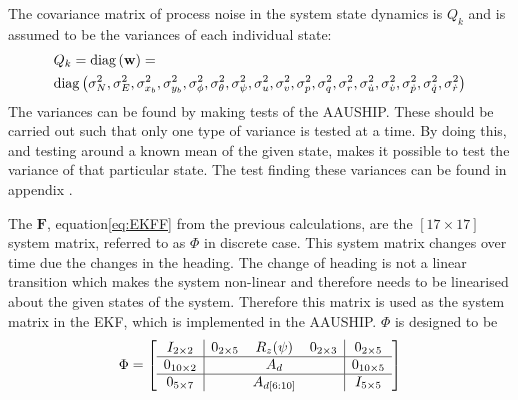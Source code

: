 The covariance matrix of process noise in the system state dynamics is $Q_k$ and is assumed to be the variances of each individual state:
\begin{align}
&Q_k = \mathrm{diag}\left(\mathbf{w}\right) = \\ \nonumber
&\mathrm{diag}\left(\sigma_{N}^2, \sigma_{E}^2, \sigma_{x_{b}}^2, \sigma_{y_{b}}^2, \sigma_{\phi}^2, \sigma_{\theta}^2, \sigma_{\psi}^2, \sigma_{u}^2, \sigma_{v}^2, \sigma_{p}^2, \sigma_{q}^2, \sigma_{r}^2, \sigma_{\dot u}^2, \sigma_{\dot v}^2, \sigma_{\dot p}^2, \sigma_{\dot q}^2, \sigma_{\dot r}^2\right)
\end{align} 
The variances can be found by making tests of the AAUSHIP. These should be carried out such that only one type of variance is tested at a time. By doing this, and testing around a known mean of the given state, makes it possible to test the variance of that particular state. The test finding these variances can be found in appendix .

The $\mathbf F$, equation\ref{eq:EKFF} from the previous calculations, are the $[17 \times 17]$ system matrix, referred to as $\Phi$ in discrete case. This system matrix changes over time due the changes in the heading. The change of heading is not a linear transition which makes the system non-linear and therefore needs to be linearised about the given states of the system. Therefore this matrix is used as the system matrix in the \ac{EKF}, which is implemented in the AAUSHIP. $\Phi$ is designed to be
\begin{align}
\Phi = 
  \left[\begin{array}{c|ccc|c}
    I_{2\times 2} & 0_{2\times 5} & R_z (\psi) & 0_{2\times 3} & 0_{2\times 5}\\ \hline
    0_{10\times2}  & \multicolumn{3}{c}{\multirow{1}{*}{{$A_d$}}} \vline&  0_{10\times 5} \\ \hline
    0_{5\times 7} & & A_{d[6:10]} & & I_{5\times 5}
  \end{array}\right]
\end{align}

